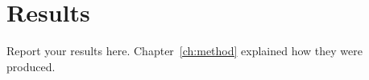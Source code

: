 \chapter{Results}
\label{ch:results}

Report your results here. Chapter~\ref{ch:method} explained how they were produced.
